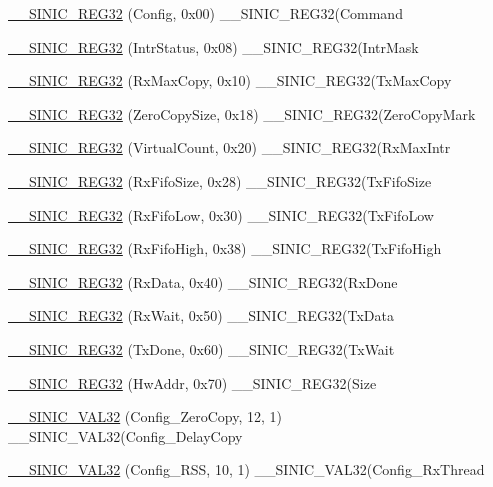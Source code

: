\begin{DoxyCompactItemize}
\item 
\hyperlink{namespaceSinic_1_1Regs_a31365c3b0fb6f3c08f07d4d1973e67dc}{\_\-\_\-SINIC\_\-REG32} (Config, 0x00) \_\-\_\-SINIC\_\-REG32(Command
\item 
\hyperlink{namespaceSinic_1_1Regs_ae9e6da6218a23a767dca42953dad3015}{\_\-\_\-SINIC\_\-REG32} (IntrStatus, 0x08) \_\-\_\-SINIC\_\-REG32(IntrMask
\item 
\hyperlink{namespaceSinic_1_1Regs_a0ec120af1a8417ba2da388fda2040f13}{\_\-\_\-SINIC\_\-REG32} (RxMaxCopy, 0x10) \_\-\_\-SINIC\_\-REG32(TxMaxCopy
\item 
\hyperlink{namespaceSinic_1_1Regs_a733ff438a1c604231e6ce036a1afc41b}{\_\-\_\-SINIC\_\-REG32} (ZeroCopySize, 0x18) \_\-\_\-SINIC\_\-REG32(ZeroCopyMark
\item 
\hyperlink{namespaceSinic_1_1Regs_a7fe36ceaf3dbf7a66169db9e96b382ae}{\_\-\_\-SINIC\_\-REG32} (VirtualCount, 0x20) \_\-\_\-SINIC\_\-REG32(RxMaxIntr
\item 
\hyperlink{namespaceSinic_1_1Regs_a444fe1ce17e955406f1bcf070db4cda1}{\_\-\_\-SINIC\_\-REG32} (RxFifoSize, 0x28) \_\-\_\-SINIC\_\-REG32(TxFifoSize
\item 
\hyperlink{namespaceSinic_1_1Regs_ae73e3b2162fe008633db77180394781a}{\_\-\_\-SINIC\_\-REG32} (RxFifoLow, 0x30) \_\-\_\-SINIC\_\-REG32(TxFifoLow
\item 
\hyperlink{namespaceSinic_1_1Regs_af0e185e22ef1e687372ab3ac6a329076}{\_\-\_\-SINIC\_\-REG32} (RxFifoHigh, 0x38) \_\-\_\-SINIC\_\-REG32(TxFifoHigh
\item 
\hyperlink{namespaceSinic_1_1Regs_a121f175cc8ac696905c4f0709d714888}{\_\-\_\-SINIC\_\-REG32} (RxData, 0x40) \_\-\_\-SINIC\_\-REG32(RxDone
\item 
\hyperlink{namespaceSinic_1_1Regs_a4ef4b9c089872d14c224869000a19bc4}{\_\-\_\-SINIC\_\-REG32} (RxWait, 0x50) \_\-\_\-SINIC\_\-REG32(TxData
\item 
\hyperlink{namespaceSinic_1_1Regs_ad4b2b5daf8ff0c89d4c61ed6fa9f9593}{\_\-\_\-SINIC\_\-REG32} (TxDone, 0x60) \_\-\_\-SINIC\_\-REG32(TxWait
\item 
\hyperlink{namespaceSinic_1_1Regs_a0edc4338948527dbb92f65cd30bdf13b}{\_\-\_\-SINIC\_\-REG32} (HwAddr, 0x70) \_\-\_\-SINIC\_\-REG32(Size
\item 
\hyperlink{namespaceSinic_1_1Regs_ade19c3f47499bb3575e71cfa918cf31e}{\_\-\_\-SINIC\_\-VAL32} (Config\_\-ZeroCopy, 12, 1) \_\-\_\-SINIC\_\-VAL32(Config\_\-DelayCopy
\item 
\hyperlink{namespaceSinic_1_1Regs_a76178a015709c6e9dd675896de3e34c9}{\_\-\_\-SINIC\_\-VAL32} (Config\_\-RSS, 10, 1) \_\-\_\-SINIC\_\-VAL32(Config\_\-RxThread

\end{DoxyCompactItemize}
